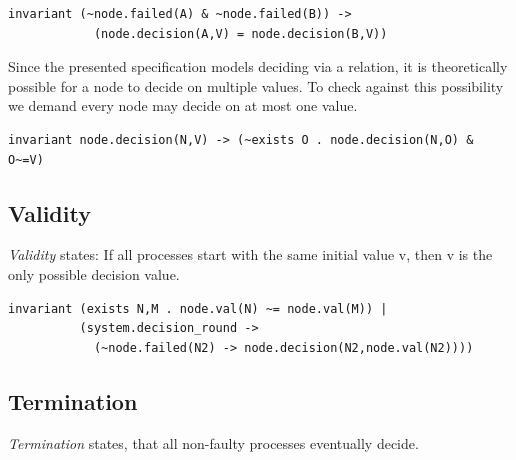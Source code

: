 \documentclass[fleqn]{article}
\begin{document}
\begin{mdframed}[nobreak=true, backgroundcolor=light-gray, roundcorner=10pt,leftmargin=1, rightmargin=1, innerleftmargin=15, innertopmargin=15,innerbottommargin=15, outerlinewidth=1, linecolor=light-gray]
\begin{lstlisting}
invariant (~node.failed(A) & ~node.failed(B)) ->
            (node.decision(A,V) = node.decision(B,V))
\end{lstlisting}
\end{mdframed}

Since the presented specification models deciding via a relation, it is theoretically possible for a node to decide on multiple values. To check against this possibility we demand every node may decide on at most one value.

\begin{mdframed}[nobreak=true, backgroundcolor=light-gray, roundcorner=10pt,leftmargin=1, rightmargin=1, innerleftmargin=15, innertopmargin=15,innerbottommargin=15, outerlinewidth=1, linecolor=light-gray]
\begin{lstlisting}
invariant node.decision(N,V) -> (~exists O . node.decision(N,O) & O~=V)
\end{lstlisting}
\end{mdframed}

\subsection{Validity}
\textit{Validity} states: If all processes start with the same initial value v, then v is the only possible decision value.

\begin{mdframed}[nobreak=true, backgroundcolor=light-gray, roundcorner=10pt,leftmargin=1, rightmargin=1, innerleftmargin=15, innertopmargin=15,innerbottommargin=15, outerlinewidth=1, linecolor=light-gray]
\begin{lstlisting}
invariant (exists N,M . node.val(N) ~= node.val(M)) |
          (system.decision_round ->
            (~node.failed(N2) -> node.decision(N2,node.val(N2))))
\end{lstlisting}
\end{mdframed}

\subsection{Termination}
\textit{Termination} states, that all non-faulty processes eventually decide.
\end{document}
